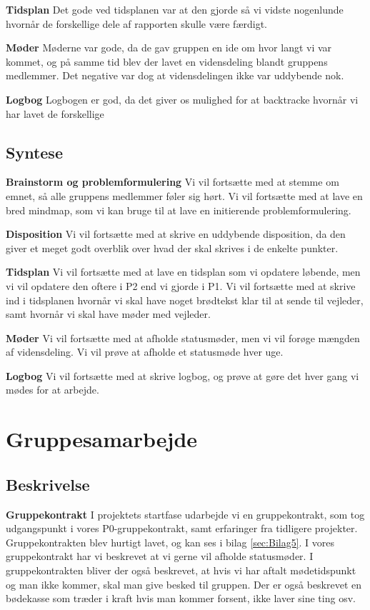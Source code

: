 \textbf{Tidsplan}
Det gode ved tidsplanen var at den gjorde så vi vidste nogenlunde hvornår de forskellige dele af rapporten skulle være færdigt. 

\textbf{Møder}
Møderne var gode, da de gav gruppen en ide om hvor langt vi var kommet, og på samme tid blev der lavet en vidensdeling blandt gruppens medlemmer. Det negative var dog at vidensdelingen ikke var uddybende nok.

\textbf{Logbog}
Logbogen er god, da det giver os mulighed for at backtracke hvornår vi har lavet de forskellige

\subsection{Syntese}
\textbf{Brainstorm og problemformulering}
Vi vil fortsætte med at stemme om emnet, så alle gruppens medlemmer føler sig hørt. Vi vil fortsætte med at lave en bred mindmap, som vi kan bruge til at lave en initierende problemformulering.

\textbf{Disposition}
Vi vil fortsætte med at skrive en uddybende disposition, da den giver et meget godt overblik over hvad der skal skrives i de enkelte punkter.

\textbf{Tidsplan}
Vi vil fortsætte med at lave en tidsplan som vi opdatere løbende, men vi vil opdatere den oftere i P2 end vi gjorde i P1. Vi vil fortsætte med at skrive ind i tidsplanen hvornår vi skal have noget brødtekst klar til at sende til vejleder, samt hvornår vi skal have møder med vejleder.

\textbf{Møder}
Vi vil fortsætte med at afholde statusmøder, men vi vil forøge mængden af vidensdeling. Vi vil prøve at afholde et statusmøde hver uge.

\textbf{Logbog}
Vi vil fortsætte med at skrive logbog, og prøve at gøre det hver gang vi mødes for at arbejde.

\section{Gruppesamarbejde}
\subsection{Beskrivelse}
\textbf{Gruppekontrakt}
I projektets startfase udarbejde vi en gruppekontrakt, som tog udgangspunkt i vores P0-gruppekontrakt, samt erfaringer fra tidligere projekter. Gruppekontrakten blev hurtigt lavet, og kan ses i bilag \ref{sec:Bilag5}. I vores gruppekontrakt har vi beskrevet at vi gerne vil afholde statusmøder. I gruppekontrakten bliver der også beskrevet, at hvis vi har aftalt mødetidspunkt og man ikke kommer, skal man give besked til gruppen. Der er også beskrevet en bødekasse som træder i kraft hvis man kommer forsent, ikke laver sine ting osv.

